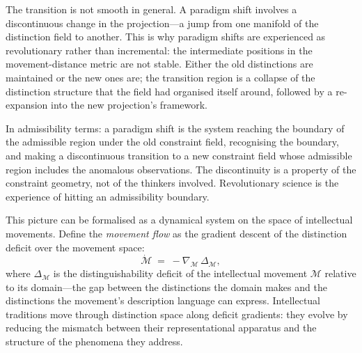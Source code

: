 \documentclass[12pt, letterpaper]{article}
\theoremstyle{remark}
\begin{document}
The transition is not smooth in general.  A paradigm shift involves a
discontinuous change in the projection---a jump from one manifold of
the distinction field to another.  This is why paradigm shifts are
experienced as revolutionary rather than incremental: the intermediate
positions in the movement-distance metric are not stable.  Either the old
distinctions are maintained or the new ones are; the transition region is
a collapse of the distinction structure that the field had organised itself
around, followed by a re-expansion into the new projection's framework.

In admissibility terms: a paradigm shift is the system reaching the boundary
of the admissible region under the old constraint field, recognising the
boundary, and making a discontinuous transition to a new constraint field
whose admissible region includes the anomalous observations.  The
discontinuity is a property of the constraint geometry, not of the thinkers
involved.  Revolutionary science is the experience of hitting an admissibility
boundary.

This picture can be formalised as a dynamical system on the space of
intellectual movements.  Define the \emph{movement flow} as the gradient
descent of the distinction deficit over the movement space:
\begin{equation}
  \dot{\mathcal{M}} \;=\; -\nabla_{\mathcal{M}}\, \Delta_{\mathcal{M}},
\end{equation}
where $\Delta_{\mathcal{M}}$ is the distinguishability deficit of the
intellectual movement $\mathcal{M}$ relative to its domain---the gap between
the distinctions the domain makes and the distinctions the movement's
description language can express.  Intellectual traditions move through
distinction space along deficit gradients: they evolve by reducing the
mismatch between their representational apparatus and the structure of
the phenomena they address.
\end{document}

